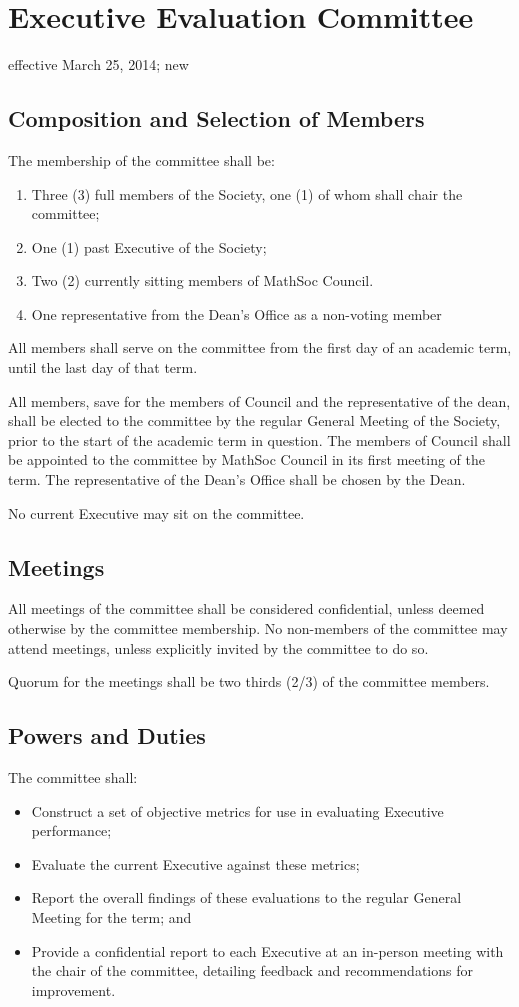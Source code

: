 \section{Executive Evaluation Committee}
effective March 25, 2014; new

\subsection{Composition and Selection of Members}
The membership of the committee shall be:
\begin{enumerate}
\item Three (3) full members of the Society, one (1) of whom shall chair the committee;
\item One (1) past Executive of the Society;
\item Two (2) currently sitting members of MathSoc Council.
\item One representative from the Dean’s Office as a non-voting member
\end{enumerate}

All members shall serve on the committee from the first day of an academic term, until the last day of that term.

All members, save for the members of Council and the representative of the dean, shall be elected to the committee by the regular General Meeting of the Society, prior to the start of the academic term in question. The members of Council shall be appointed to the committee by MathSoc Council in its first meeting of the term. The representative of the Dean’s Office shall be chosen by the Dean.

No current Executive may sit on the committee.

\subsection{Meetings}

All meetings of the committee shall be considered confidential, unless deemed otherwise by the committee membership. No non-members of the committee may attend meetings, unless explicitly invited by the committee to do so.

Quorum for the meetings shall be two thirds (2/3) of the committee members.

\subsection{Powers and Duties}

The committee shall:
\begin{itemize}
\item Construct a set of objective metrics for use in evaluating Executive performance;
\item Evaluate the current Executive against these metrics;
\item Report the overall findings of these evaluations to the regular General Meeting for the term;
and
\item Provide a confidential report to each Executive at an in-person meeting with the chair of the
committee, detailing feedback and recommendations for improvement.
\end{itemize}
